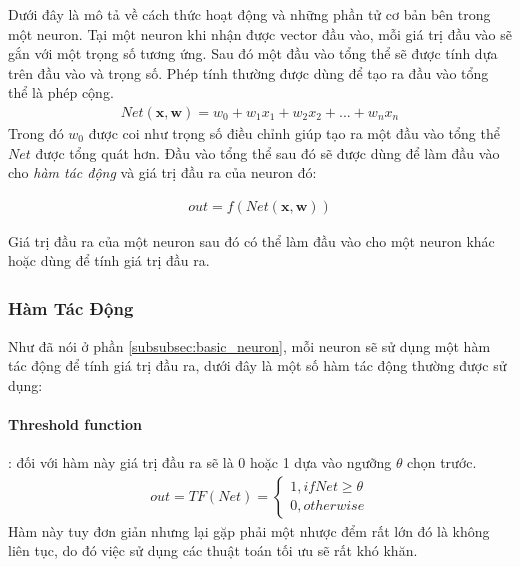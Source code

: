 \documentclass[fontsize=12pt]{scrartcl}
\begin{document}
Dưới đây là mô tả về cách thức hoạt động và những phần tử cơ bản bên trong một neuron. Tại một neuron khi nhận được vector đầu vào, mỗi giá trị đầu vào sẽ gắn với một trọng số tương ứng. Sau đó một đầu vào tổng thể sẽ được tính dựa trên đầu vào và trọng số. Phép tính thường được dùng để tạo ra đầu vào tổng thể là phép cộng.
\begin{align}
Net(\boldsymbol{x},\boldsymbol{w}) = w_0 + w_1x_1 + w_2x_2 + . . . + w_nx_n
\end{align}
Trong đó $w_0$ được coi như trọng số điều chỉnh giúp tạo ra một đầu vào tổng thể  $Net$ được tổng quát hơn. Đầu vào tổng thể sau đó sẽ được dùng để làm đầu vào cho \textit{hàm tác động} và giá trị đầu ra của neuron đó:
\begin{center}
\begin{align}
out = f(Net(\boldsymbol{x},\boldsymbol{w}))
\end{align}
\end{center}
Giá trị đầu ra của một neuron sau đó có thể làm đầu vào cho một neuron khác hoặc dùng để tính giá trị đầu ra.
\subsubsection{Hàm Tác Động\textsuperscript{\cite{khoattq,activation_medium}}}
Như đã nói ở phần \ref{subsubsec:basic_neuron}, mỗi neuron sẽ sử dụng một hàm tác động để tính giá trị đầu ra, dưới đây là một số hàm tác động thường được sử dụng:
\paragraph*{Threshold function}: đối với hàm này giá trị đầu ra sẽ là 0 hoặc 1 dựa vào ngưỡng $\theta$ chọn trước.
\begin{align}
out = TF(Net) = \begin{cases}
                  1, if Net \ge\theta\\
                  0, otherwise
    			\end{cases}
\end{align}
Hàm này tuy đơn giản nhưng lại gặp phải một nhược đểm rất lớn đó là không liên tục, do đó việc sử dụng các thuật toán tối ưu sẽ rất khó khăn.
\end{document}
